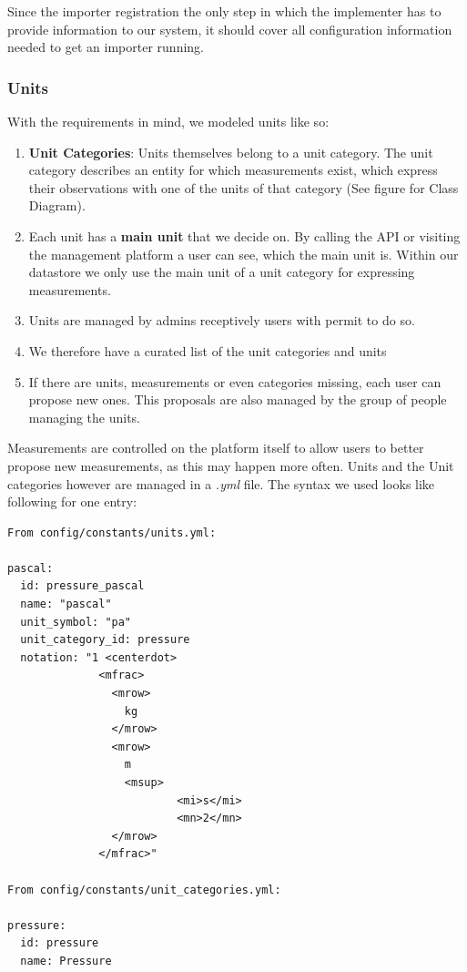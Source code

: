 Since the importer registration the only step in which the implementer
has to provide information to our system, it should cover all
configuration information needed to get an importer running.

\subsubsection{Units}\label{units}

With the requirements in mind, we modeled units like so:

\begin{enumerate}
\def\labelenumi{\arabic{enumi}.}
\tightlist
\item
  \textbf{Unit Categories}: Units themselves belong to a unit category.
  The unit category describes an entity for which measurements exist,
  which express their observations with one of the units of that
  category (See figure for Class Diagram).
\item
  Each unit has a \textbf{main unit} that we decide on. By calling the
  API or visiting the management platform a user can see, which the main
  unit is. Within our datastore we only use the main unit of a unit
  category for expressing measurements.
\item
  Units are managed by admins receptively users with permit to do so.
\item
  We therefore have a curated list of the unit categories and units
\item
  If there are units, measurements or even categories missing, each user
  can propose new ones. This proposals are also managed by the group of
  people managing the units.
\end{enumerate}

Measurements are controlled on the platform itself to allow users to
better propose new measurements, as this may happen more often. Units
and the Unit categories however are managed in a \emph{.yml} file. The
syntax we used looks like following for one entry:

\begin{verbatim}
From config/constants/units.yml:

pascal:
  id: pressure_pascal
  name: "pascal"
  unit_symbol: "pa"
  unit_category_id: pressure
  notation: "1 <centerdot>
              <mfrac>
                <mrow>
                  kg
                </mrow>
                <mrow>
                  m
                  <msup>
                          <mi>s</mi>
                          <mn>2</mn>
                </mrow>
              </mfrac>"

From config/constants/unit_categories.yml:

pressure:
  id: pressure
  name: Pressure
\end{verbatim}

